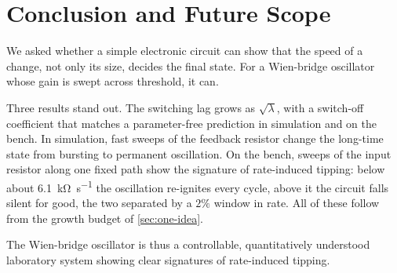 \chapter{Conclusion and Future Scope}\label{ch:conclusion}\label{ch:future}

We asked whether a simple electronic circuit can show that the speed of a change, not only its size,
decides the final state. For a Wien-bridge oscillator whose gain is swept across threshold, it can.

Three results stand out. The switching lag grows as $\sqrt{\lambda}$, with a switch-off coefficient that
matches a parameter-free prediction in simulation and on the bench. In simulation, fast sweeps of the
feedback resistor change the long-time state from bursting to permanent oscillation. On the bench,
sweeps of the input resistor along one fixed path show the signature of rate-induced tipping: below about
\SI{6.1}{\kilo\ohm\per\second} the oscillation re-ignites every cycle, above it the circuit falls silent
for good, the two separated by a $2\%$ window in rate. All of these follow from the growth budget of
\cref{sec:one-idea}.

The Wien-bridge oscillator is thus a controllable, quantitatively understood laboratory system showing
clear signatures of rate-induced tipping.
